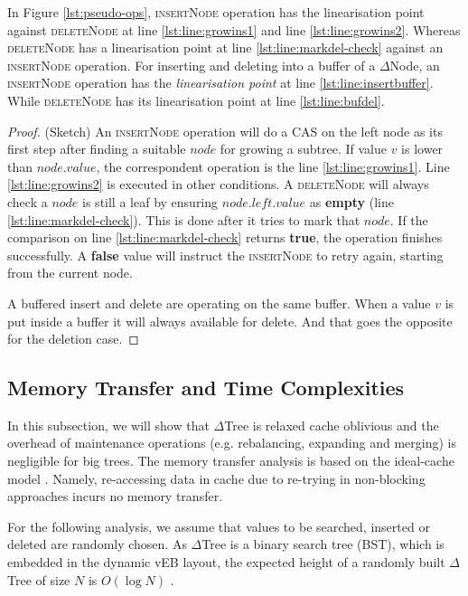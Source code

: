 \begin{lemma} 
In Figure \ref{lst:pseudo-ops}, \textsc{insertNode} operation has the linearisation 
point against \textsc{deleteNode} at line \ref{lst:line:growins1} and line \ref{lst:line:growins2}. 
Whereas \textsc{deleteNode} has a linearisation point at line \ref{lst:line:markdel-check}
against an \textsc{insertNode} operation. 
For inserting and deleting into a buffer of a $\Delta$Node, an \textsc{insertNode} 
operation has the \textit{linearisation point} at line \ref{lst:line:insertbuffer}. While
\textsc{deleteNode} has its linearisation point at line \ref{lst:line:bufdel}.
\label{lem:linear-ins-del}
\end{lemma}
\begin{proof}(Sketch) An \textsc{insertNode} operation will do a \textsc{CAS} on the left node
as its first step after finding a suitable $node$ for growing a subtree. If value $v$
is lower than  $node.value$, the correspondent operation is the line \ref{lst:line:growins1}.
Line \ref{lst:line:growins2} is executed in other conditions. A \textsc{deleteNode} will always
check a $node$ is still a leaf by ensuring $node.left.value$ as \textbf{empty}
(line \ref{lst:line:markdel-check}). This is done after it tries to mark that $node$. If the comparison
on line \ref{lst:line:markdel-check} returns \textbf{true}, the operation finishes successfully.
A \textbf{false} value will instruct the \textsc{insertNode} to retry again, starting from
the current node.

A buffered insert and delete are operating on the same buffer. When a value $v$ is put inside
a buffer it will always available for delete. And that goes the opposite for the deletion case.  
\end{proof}


\subsection{Memory Transfer and Time Complexities} 
 
In this subsection, we will show that $\Delta$Tree is relaxed cache oblivious
and the overhead of maintenance operations (e.g. rebalancing, expanding and
merging) is negligible for big trees. The memory transfer analysis is based on
the ideal-cache model \cite{Frigo:1999:CA:795665.796479}. Namely, re-accessing
data in cache due to re-trying in non-blocking approaches incurs no memory
transfer.

For the following analysis, we assume that values to be searched, inserted or
deleted are randomly chosen. As $\Delta$Tree is a binary search tree (BST),
which is embedded in the dynamic vEB layout, the expected height of a randomly
built $\Delta$Tree of size $N$ is $O(\log N)$ \cite{CormenSRL01}.

